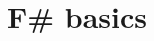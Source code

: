 \documentclass[springer.tex]{subfiles}
\begin{document}
\part{F\# basics}
\label{part:basics}
\end{document}

